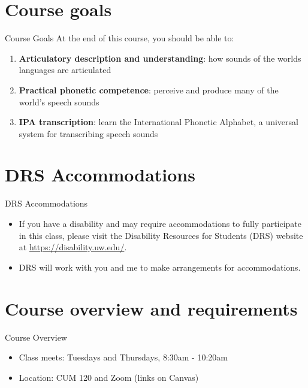 \documentclass{beamer}
\begin{document}
\section{Course goals}
\begin{frame}{Course Goals}
    At the end of this course, you should be able to:
    \begin{enumerate}
        \item \textbf{Articulatory description and understanding}: how sounds of the worlds languages are articulated
        \item \textbf{Practical phonetic competence}: perceive and produce many of the world’s speech sounds
        \item \textbf{IPA transcription}: learn the International Phonetic Alphabet, a universal system for transcribing speech sounds
    \end{enumerate}
\end{frame}

\section{DRS Accommodations}

\begin{frame}{DRS Accommodations}
    \begin{itemize}

        \item If you have a disability and may require accommodations to fully participate in this class, please visit the Disability Resources for Students (DRS) website at \url{https://disability.uw.edu/}.
        \item DRS will work with you and me to make arrangements for accommodations.
    \end{itemize}
\end{frame}

\section{Course overview and requirements}
\begin{frame}{Course Overview}
    \begin{itemize}
        \item Class meets: Tuesdays and Thursdays, 8:30am - 10:20am
        \item Location: CUM 120 and Zoom (links on Canvas)
    \end{itemize}
\end{frame}
\end{document}
